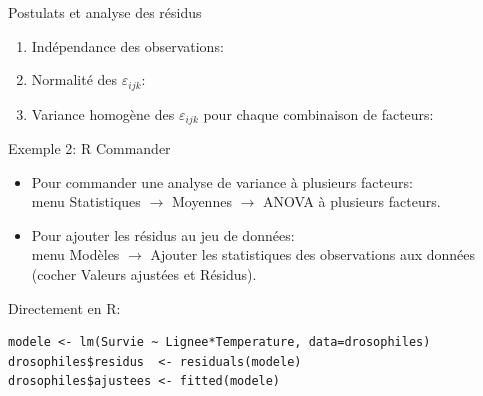 \documentclass{BeamerTemplate}
\begin{document}
\begin{frame}[t]{Postulats et analyse des résidus}

\begin{enumerate}\itemsep3mm
  \item \alert{Indépendance} des observations:\\
  \item \alert{Normalité} des $\varepsilon_{ijk}$:\\
  \item \alert{Variance homogène} des $\varepsilon_{ijk}$ pour chaque combinaison de facteurs:\\
\end{enumerate}


\end{frame}

\begin{frame}[fragile,t]{Exemple 2: R Commander}

\begin{itemize}\itemsep5mm
  \item Pour commander une analyse de variance à plusieurs facteurs:\\
  menu \textsf{Statistiques} $\rightarrow$ \textsf{Moyennes}
  $\rightarrow$ \textsf{ANOVA à plusieurs facteurs}.
  \item Pour ajouter les résidus au jeu de données:\\
  menu \textsf{Modèles} $\rightarrow$ \textsf{Ajouter les statistiques des
  observations aux données} (cocher \textsf{Valeurs ajustées} et \textsf{Résidus}).
\end{itemize}

\medskip
Directement en R:
\begin{Verbatim}[fontsize=\small]
modele <- lm(Survie ~ Lignee*Temperature, data=drosophiles)
drosophiles$residus  <- residuals(modele)
drosophiles$ajustees <- fitted(modele)
\end{Verbatim}

\end{frame}
\end{document}
